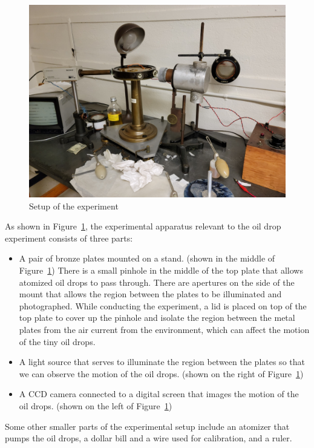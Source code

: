 \documentclass{article}
\begin{document}
\begin{figure}
	\includegraphics[width=\columnwidth]{setup.jpg}
    \caption{Setup of the experiment}
    \label{fig:setup}
\end{figure}

As shown in Figure~\ref{fig:setup}, the experimental apparatus relevant to the oil drop experiment consists of three parts:
\begin{itemize}
    \item A pair of bronze plates mounted on a stand. (shown in the middle of Figure~\ref{fig:setup}) There is a small pinhole in the middle of the top plate that allows atomized oil drops to pass through. There are apertures on the side of the mount that allows the region between the plates to be illuminated and photographed. While conducting the experiment, a lid is placed on top of the top plate to cover up the pinhole and isolate the region between the metal plates from the air current from the environment, which can affect the motion of the tiny oil drops. 
    \item A light source that serves to illuminate the region between the plates so that we can observe the motion of the oil drops. (shown on the right of Figure~\ref{fig:setup}) 
    \item A CCD camera connected to a digital screen that images the motion of the oil drops. (shown on the left of Figure~\ref{fig:setup}) 
\end{itemize}

Some other smaller parts of the experimental setup include an atomizer that pumps the oil drops, a dollar bill and a wire used for calibration, and a ruler.
\end{document}

